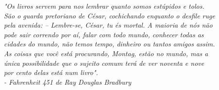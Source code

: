 \documentclass[
	12pt,				%
	openright,			%
	oneside,      %
	a4paper,			%
	english,			%
	french,				%
	spanish,			%
	brazil,				%
	]{abntex2}\usepackage[]{graphicx}\usepackage[table]{xcolor}
\theoremstyle{definition}
\theoremstyle{remark}
\begin{document}

\frenchspacing


\imprimircapa

\imprimirfolhaderosto
\clearpage

\begin{epigrafe} 
  \vspace*{\fill} 
  \begin{flushright} 
  \textit{"Os livros servem para nos lembrar quanto somos estúpidos e tolos. 
      \\ São o guarda pretoriano de César, cochichando enquanto o desfile ruge 
      \\ pela avenida: – Lembre-se, César, tu és mortal. A maioria de nós não 
      \\ pode sair correndo por aí, falar com todo mundo, conhecer todas as 
      \\ cidades do mundo, não temos tempo, dinheiro ou tantos amigos assim. 
      \\ As coisas que você está procurando, Montag, estão no mundo, mas a 
      \\ única possibilidade que o sujeito comum terá de ver noventa e nove 
      \\ por cento delas está num livro". 
      \\ - Fahrenheit 451 de Ray Douglas Bradbury} 
  \end{flushright} 
\end{epigrafe}
\end{document}
